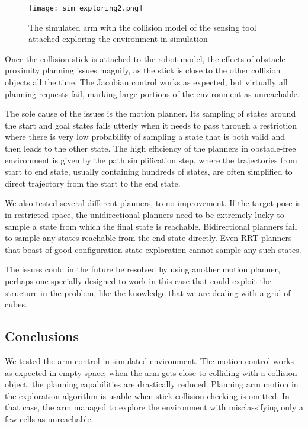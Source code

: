 \documentclass[buriama8_dp.tex]{subfiles}
\begin{document}
\begin{figure}[ht]
  \centering
  \texttt{[image: sim\_exploring2.png]}
  \caption[Simulated arm exploring environment]{The simulated arm with the collision model of the sensing tool attached exploring the environment in simulation}
  \label{fig:sim_expl}
\end{figure}

Once the collision stick is attached to the robot model, the effects of obstacle proximity planning issues magnify, as the stick is close to the other collision objects all the time. The Jacobian control works as expected, but virtually all planning requests fail, marking large portions of the environment as unreachable.

The sole cause of the issues is the motion planner. Its sampling of states around the start and goal states fails utterly when it needs to pass through a restriction where there is very low probability of sampling a state that is both valid and then leads to the other state. The high efficiency of the planners in obstacle-free environment is given by the path simplification step, where the trajectories from start to end state, usually containing hundreds of states, are often simplified to direct trajectory from the start to the end state.

We also tested several different planners, to no improvement. If the target pose is in restricted space, the unidirectional planners need to be extremely lucky to sample a state from which the final state is reachable. Bidirectional planners fail to sample any states reachable from the end state directly. Even RRT planners that boast of good configuration state exploration cannot sample any such states.

The issues could in the future be resolved by using another motion planner, perhaps one specially designed to work in this case that could exploit the structure in the problem, like the knowledge that we are dealing with a grid of cubes.

\subsection{Conclusions}
\label{subsec:exp_sim_concl}

We tested the arm control in simulated environment. The motion control works as expected in empty space; when the arm gets close to colliding with a collision object, the planning capabilities are drastically reduced. Planning arm motion in the exploration algorithm is usable when stick collision checking is omitted. In that case, the arm managed to explore the environment with misclassifying only a few cells as unreachable.
\end{document}
